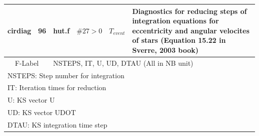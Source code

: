 \begin{longtable}{||p{0.42in}|p{0.25in}|p{0.6in}|p{0.6in}|p{0.4in}|p{2.3in}||}
  cirdiag    & 96  & hut.f      & $\#27>0$     & $T_{event}$    & Diagnostics for reducing steps of integration equations for eccentricity and angular velocites of stars (Equation 15.22 in Sverre, 2003 book) \\\hline
\multicolumn{2}{|c|}{ F-Label } & \multicolumn{4}{|p{4.4in}|}{NSTEPS, IT, U, UD, DTAU (All in NB unit)} \\\hline
\multicolumn{6}{|p{5.4in}|}{ NSTEPS: Step number for integration } \\
\multicolumn{6}{|p{5.4in}|}{ IT: Iteration times for reduction} \\
\multicolumn{6}{|p{5.4in}|}{ U: KS vector U} \\
\multicolumn{6}{|p{5.4in}|}{ UD: KS vector UDOT} \\
\multicolumn{6}{|p{5.4in}|}{ DTAU: KS integration time step } \\\hline
\end{longtable}


